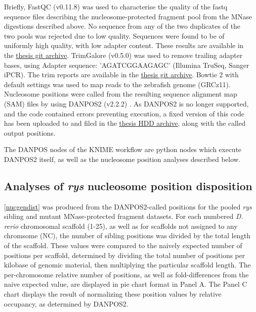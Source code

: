 Briefly, FastQC (v0.11.8) \cite{Andrews2018} was used to characterise the quality of the fastq sequence files describing the nucleosome-protected fragment pool from the MNase digestions described above. No sequence from any of the two duplicates of the two pools was rejected due to low quality. Sequences were found to be of uniformly high quality, with low adapter content. These results are available in the  \hyperref[sec:archive]{thesis git archive}. TrimGalore (v0.5.0) \cite{Andrews2018a} was used to remove trailing adapter bases, using Adapter sequence: 'AGATCGGAAGAGC' (Illumina TruSeq, Sanger iPCR). The trim reports are available in the \hyperref[sec:archive]{thesis git archive}.  Bowtie 2 \cite{Langmead2012} with default settings was used to map reads to the zebrafish genome (GRCz11). Nucleosome positions were called from the resulting sequence alignment map (SAM) files by using DANPOS2 (v2.2.2) \cite{Chen2013}. As DANPOS2 is no longer supported, and the code contained errors preventing execution, a fixed version of this code has been uploaded to  and filed in the \hyperref[sec:archive]{thesis HDD archive}, along with the called output positions.

The DANPOS nodes of the KNIME workflow are python nodes which execute DANPOS2 itself, as well as the nucleosome position analyses described below. 

\subsection{Analyses of \textit{rys} nucleosome position disposition}
\autoref{nucgendist} was produced from the DANPOS2-called positions for the pooled \textit{rys} sibling and mutant MNase-protected fragment datasets. For each numbered \textit{D. rerio} chromosomal scaffold (1-25), as well as for scaffolds not assigned to any chromsome (NC), the number of sibling positions was divided by the total length of the scaffold. These values were compared to the naively expected number of positions per scaffold, determined by dividing the total number of positions per kilobase of genomic material, then multiplying the particular scaffold length. The per-chromosome relative number of positions, as well as fold-differences from the naive expected value, are displayed in pie chart format in Panel A. The Panel C chart displays the result of normalizing these position values by relative occupancy, as determined by DANPOS2. 

